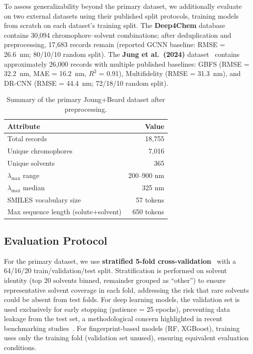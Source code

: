 \documentclass[journal=jcisd8,manuscript=article]{achemso}
\begin{document}
To assess generalizability beyond the primary dataset, we additionally evaluate on two external datasets using their published split protocols, training models from scratch on each dataset's training split.
The \textbf{Deep4Chem} database~\cite{joung2021deep} contains 30,094 chromophore--solvent combinations; after deduplication and preprocessing, 17,683 records remain (reported GCNN baseline: RMSE = 26.6~nm; 80/10/10 random split).
The \textbf{Jung et al.\ (2024)} dataset~\cite{jung2024machine} contains approximately 26,000 records with multiple published baselines: GBFS (RMSE = 32.2~nm, MAE = 16.2~nm, $R^2$ = 0.91), Multifidelity (RMSE = 31.3~nm), and DR-CNN (RMSE = 44.4~nm; 72/18/10 random split).

\begin{table}[htbp]
\centering
\caption{Summary of the primary Joung+Beard dataset after preprocessing.}
\label{tab:dataset_summary}
\begin{tabular}{lr}
\toprule
\textbf{Attribute} & \textbf{Value} \\
\midrule
Total records & 18,755 \\
Unique chromophores & 7,016 \\
Unique solvents & 365 \\
$\lambda_{\max}$ range & 200--900 nm \\
$\lambda_{\max}$ median & 325 nm \\
SMILES vocabulary size & 57 tokens \\
Max sequence length (solute+solvent) & 650 tokens \\
\bottomrule
\end{tabular}
\end{table}


\subsection{Evaluation Protocol}
\label{sec:evaluation}

For the primary dataset, we use \textbf{stratified 5-fold cross-validation}~\cite{kohavi1995study} with a 64/16/20 train/validation/test split.
Stratification is performed on solvent identity (top 20 solvents binned, remainder grouped as ``other'') to ensure representative solvent coverage in each fold, addressing the risk that rare solvents could be absent from test folds.
For deep learning models, the validation set is used exclusively for early stopping (patience = 25 epochs), preventing data leakage from the test set, a methodological concern highlighted in recent benchmarking studies~\cite{panapitiya2022evaluation}.
For fingerprint-based models (RF, XGBoost), training uses only the training fold (validation set unused), ensuring equivalent evaluation conditions.
\end{document}
